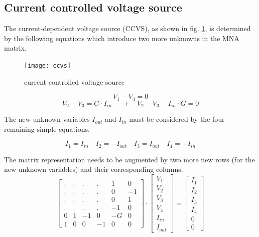 \documentclass[10pt]{report}
\begin{document}
\subsection{Current controlled voltage source}

The current-dependent voltage source (CCVS), as shown in fig.
\ref{fig:ccvs}, is determined by the following equations which
introduce two more unknowns in the MNA matrix.

\begin{figure}[ht]
\begin{center}
\texttt{[image: ccvs]}
\end{center}
\caption{current controlled voltage source}
\label{fig:ccvs}
\end{figure}
\FloatBarrier

\begin{equation}
V_{1} - V_{4} = 0
\end{equation}
\begin{equation}
V_{2} - V_{3} = G\cdot I_{in}
\quad \rightarrow \quad
V_{2} - V_{3} - I_{in}\cdot G = 0
\label{eq:ccvs}
\end{equation}

The new unknown variables $I_{out}$ and $I_{in}$ must be considered by
the four remaining simple equations.

\begin{equation}
I_{1} = I_{in} \quad I_{2} = -I_{out} \quad I_{3} = I_{out} \quad I_{4} = -I_{in}
\end{equation}

The matrix representation needs to be augmented by two more new rows
(for the new unknown variables) and their corresponding columns.
\begin{equation}
\begin{bmatrix}
.&.&.&.& 1 & 0\\
.&.&.&.& 0 & -1\\
.&.&.&.& 0 & 1\\
.&.&.&.& -1 & 0\\
0 & 1 & -1 & 0 & -G & 0\\
1 & 0 & 0 & -1 & 0 & 0
\end{bmatrix}
\cdot
\begin{bmatrix}
V_{1}\\
V_{2}\\
V_{3}\\
V_{4}\\
I_{in}\\
I_{out}
\end{bmatrix}
=
\begin{bmatrix}
I_{1}\\
I_{2}\\
I_{3}\\
I_{4}\\
0\\
0
\end{bmatrix}
\end{equation}
\end{document}
